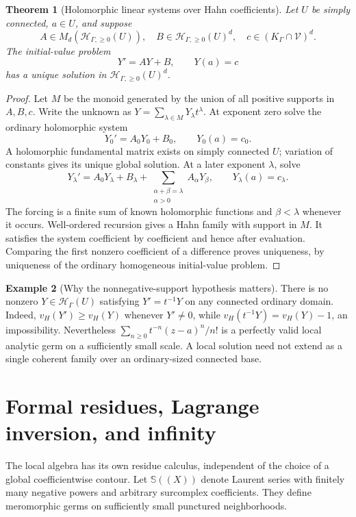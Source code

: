 \documentclass[11pt,a4paper]{article}
\newtheorem{theorem}{Theorem}[section]
\theoremstyle{definition}
\newtheorem{example}[theorem]{Example}
\theoremstyle{remark}
\newcommand{\SC}{\mathbb S}
\newcommand{\HH}{\mathcal H}
\newcommand{\Fin}{\mathcal V}
\begin{document}
\begin{theorem}[Holomorphic linear systems over Hahn coefficients]\label{thm:ODE}
Let $U$ be simply connected, $a\in U$, and suppose
\[
 A\in M_d(\HH_{\Gamma,\ge0}(U)),\quad
 B\in\HH_{\Gamma,\ge0}(U)^d,\quad
 c\in (K_\Gamma\cap\Fin)^d.
\]
The initial-value problem
\[
 Y'=AY+B,\qquad Y(a)=c
\]
has a unique solution in $\HH_{\Gamma,\ge0}(U)^d$.
\end{theorem}
\begin{proof}
Let $M$ be the monoid generated by the union of all positive supports
in $A,B,c$. Write the unknown as $Y=\sum_{\lambda\in M}Y_\lambda
t^\lambda$. At exponent zero solve the ordinary holomorphic system
\[
 Y_0'=A_0Y_0+B_0,\qquad Y_0(a)=c_0.
\]
A holomorphic fundamental matrix exists on simply connected $U$;
variation of constants gives its unique global solution.
At a later exponent $\lambda$, solve
\[
 Y_\lambda'=A_0Y_\lambda+B_\lambda+
      \sum_{\substack{\alpha+\beta=\lambda\\\alpha>0}}
                    A_\alpha Y_\beta,
 \qquad Y_\lambda(a)=c_\lambda.
\]
The forcing is a finite sum of known holomorphic functions and
$\beta<\lambda$ whenever it occurs. Well-ordered recursion gives a
Hahn family with support in $M$. It satisfies the system coefficient
by coefficient and hence after evaluation. Comparing the first
nonzero coefficient of a difference proves uniqueness, by uniqueness
of the ordinary homogeneous initial-value problem.
\end{proof}

\begin{example}[Why the nonnegative-support hypothesis matters]
There is no nonzero $Y\in\HH_\Gamma(U)$ satisfying
$Y'=t^{-1}Y$ on any connected ordinary domain. Indeed,
$v_H(Y')\ge v_H(Y)$ whenever $Y'\ne0$, while
$v_H(t^{-1}Y)=v_H(Y)-1$, an impossibility. Nevertheless
$\sum_{n\ge0}t^{-n}(z-a)^n/n!$ is a perfectly valid local analytic
germ on a sufficiently small scale. A local solution need not extend
as a single coherent family over an ordinary-sized connected base.
\end{example}

\section{Formal residues, Lagrange inversion, and infinity}\label{sec:formalres}
The local algebra has its own residue calculus, independent of the
choice of a global coefficientwise contour. Let
$\SC((X))$ denote Laurent series with finitely many negative powers
and arbitrary surcomplex coefficients. They define meromorphic germs
on sufficiently small punctured neighborhoods.
\end{document}
